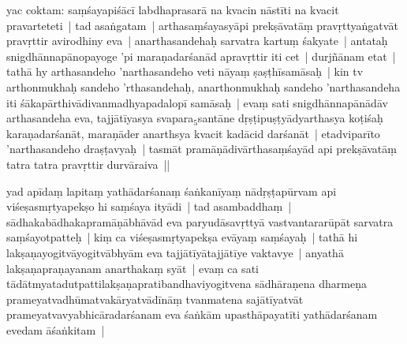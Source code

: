 \documentclass[article,12pt,a4paper]{memoir}%
\newcounter{parCount}
\begin{document}
	  \pstart \leavevmode%
	\label{thakur75-43.4}yac coktam: saṃśayapiśācī labdhaprasarā na kvacin nāstīti na kvacit pravarteteti | tad asaṅgatam | arthasaṃśayasyāpi prekṣāvatāṃ pravṛttyaṅgatvāt pravṛttir avirodhiny eva | anarthasandehaḥ sarvatra kartuṃ śakyate | antataḥ snigdhānnapānopayoge 'pi maraṇadarśanād apravṛttir iti cet | durjñānam etat | tathā hy arthasandeho 'narthasandeho veti nāyaṃ ṣaṣṭhīsamāsaḥ | kin tv arthonmukhaḥ sandeho 'rthasandehaḥ, anarthonmukhaḥ sandeho 'narthasandeha iti śākapārthivādivanmadhyapadalopī samāsaḥ | evaṃ sati snigdhānnapānādāv arthasandeha eva, tajjātīyasya svapara{\tiny $_{5}$}santāne dṛṣṭipuṣṭyādyarthasya koṭiśaḥ karaṇadarśanāt, maraṇāder anarthsya kvacit kadācid darśanāt | \label{ratnakīrtinibandhāvali__36r1PF7IMW5NG28AHCCLVFKB31B}etadviparīto\label{ratnakīrtinibandhāvali__36r1PF7IMW4W5CE0I89H8GG6RQN} 'narthasandeho draṣṭavyaḥ | tasmāt pramāṇādivārthasaṃśayād api prekṣāvatāṃ tatra tatra pravṛttir durvāraiva ||
	{}
	\pend%
      

	  \pstart \leavevmode%
	\label{thakur75-43.13}yad apīdaṃ lapitaṃ yathādarśanaṃ śaṅkanīyaṃ nādṛṣṭapūrvam api viśeṣasmṛtyapekṣo hi saṃśaya ityādi | tad asambaddhaṃ | sādhakabādhakapramāṇābhāvād eva paryudāsavṛttyā \label{ratnakīrtinibandhāvali__36r1PF7IMW45SFTLRLUVTIHXJ6N}vastvantara\label{ratnakīrtinibandhāvali__36r1PF7IMW3EBY5XOPZTJQUZJ9I}rūpāt sarvatra saṃśayotpatteḥ | kiṃ ca viśeṣasmṛtyapekṣa evāyaṃ saṃśayaḥ | tathā hi lakṣaṇayogitvāyogitvābhyām eva tajjātīyātajjātīye vaktavye | anyathā lakṣaṇapraṇayanam anarthakaṃ syāt | evaṃ ca sati tādātmyatadutpattilakṣaṇapratibandhaviyogitvena sādhāraṇena dharmeṇa prameyatvadhūmatvakārya\leavevmode{}tvādīnāṃ tvanmatena sajātīyatvāt prameyatvavyabhicāradarśanam eva śaṅkām upasthāpayatīti yathādarśanam evedam āśaṅkitam |
	{}
	\pend%
      
\end{document}
